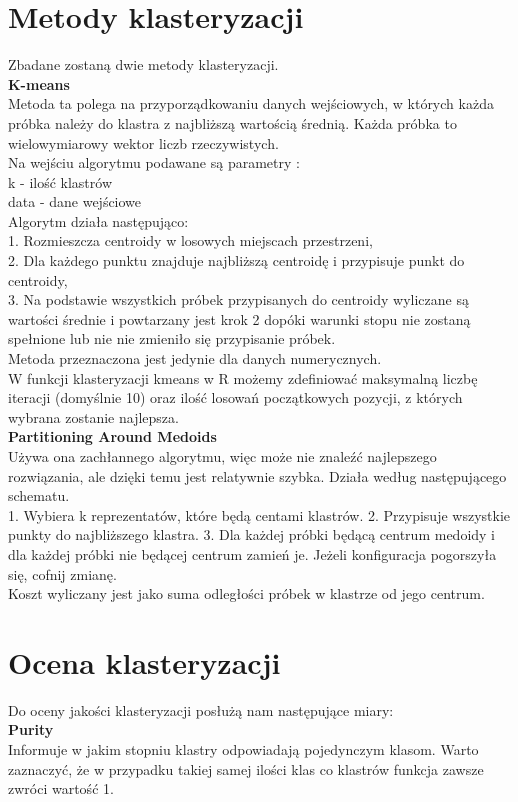 \documentclass[12pt,a4paper]{article}
\begin{document}
\section{Metody klasteryzacji}
Zbadane zostaną dwie metody klasteryzacji.\\
\textbf{K-means}\\
Metoda ta polega na przyporządkowaniu danych wejściowych, w których każda próbka należy do klastra z najbliższą wartością średnią. Każda próbka to wielowymiarowy wektor liczb rzeczywistych.\\
Na wejściu algorytmu podawane są parametry : \\
k - ilość klastrów\\
data - dane wejściowe\\
Algorytm działa następująco:\\
1. Rozmieszcza centroidy  w losowych miejscach przestrzeni, \\
2. Dla każdego punktu znajduje najbliższą centroidę i przypisuje punkt do centroidy,\\
3. Na podstawie wszystkich próbek przypisanych do centroidy wyliczane są wartości średnie i powtarzany jest krok 2 dopóki warunki stopu nie zostaną spełnione lub nie nie zmieniło się przypisanie próbek.\\
Metoda przeznaczona jest jedynie dla danych numerycznych.\\
W funkcji klasteryzacji kmeans w R możemy zdefiniować maksymalną liczbę iteracji (domyślnie 10) oraz ilość losowań początkowych pozycji, z których wybrana zostanie najlepsza.\\
\textbf{Partitioning Around Medoids}\\
Używa ona zachłannego algorytmu, więc może nie znaleźć najlepszego rozwiązania, ale dzięki temu jest relatywnie szybka. Działa według następującego schematu.\\
1. Wybiera k reprezentatów, które będą centami klastrów.
2. Przypisuje wszystkie punkty do najbliższego klastra.
3. Dla każdej próbki będącą centrum medoidy i dla każdej próbki nie będącej centrum zamień je. Jeżeli konfiguracja pogorszyła się, cofnij zmianę.\\
Koszt wyliczany jest jako suma odległości próbek w klastrze od jego centrum.


\section{Ocena klasteryzacji}
Do oceny jakości klasteryzacji posłużą nam następujące miary:\\
\textbf{Purity}\\
Informuje w jakim stopniu klastry odpowiadają pojedynczym klasom. Warto zaznaczyć, że w przypadku takiej samej ilości klas co klastrów funkcja zawsze zwróci wartość 1.
\end{document}
